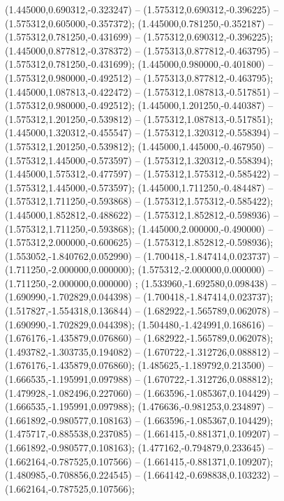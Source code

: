  (1.445000,0.690312,-0.323247) -- (1.575312,0.690312,-0.396225) -- (1.575312,0.605000,-0.357372);
 (1.445000,0.781250,-0.352187) -- (1.575312,0.781250,-0.431699) -- (1.575312,0.690312,-0.396225);
 (1.445000,0.877812,-0.378372) -- (1.575313,0.877812,-0.463795) -- (1.575312,0.781250,-0.431699);
 (1.445000,0.980000,-0.401800) -- (1.575312,0.980000,-0.492512) -- (1.575313,0.877812,-0.463795);
 (1.445000,1.087813,-0.422472) -- (1.575312,1.087813,-0.517851) -- (1.575312,0.980000,-0.492512);
 (1.445000,1.201250,-0.440387) -- (1.575312,1.201250,-0.539812) -- (1.575312,1.087813,-0.517851);
 (1.445000,1.320312,-0.455547) -- (1.575312,1.320312,-0.558394) -- (1.575312,1.201250,-0.539812);
 (1.445000,1.445000,-0.467950) -- (1.575312,1.445000,-0.573597) -- (1.575312,1.320312,-0.558394);
 (1.445000,1.575312,-0.477597) -- (1.575312,1.575312,-0.585422) -- (1.575312,1.445000,-0.573597);
 (1.445000,1.711250,-0.484487) -- (1.575312,1.711250,-0.593868) -- (1.575312,1.575312,-0.585422);
 (1.445000,1.852812,-0.488622) -- (1.575312,1.852812,-0.598936) -- (1.575312,1.711250,-0.593868);
 (1.445000,2.000000,-0.490000) -- (1.575312,2.000000,-0.600625) -- (1.575312,1.852812,-0.598936);
 (1.553052,-1.840762,0.052990) -- (1.700418,-1.847414,0.023737) -- (1.711250,-2.000000,0.000000);
 (1.575312,-2.000000,0.000000) -- (1.711250,-2.000000,0.000000) ;
 (1.533960,-1.692580,0.098438) -- (1.690990,-1.702829,0.044398) -- (1.700418,-1.847414,0.023737);
 (1.517827,-1.554318,0.136844) -- (1.682922,-1.565789,0.062078) -- (1.690990,-1.702829,0.044398);
 (1.504480,-1.424991,0.168616) -- (1.676176,-1.435879,0.076860) -- (1.682922,-1.565789,0.062078);
 (1.493782,-1.303735,0.194082) -- (1.670722,-1.312726,0.088812) -- (1.676176,-1.435879,0.076860);
 (1.485625,-1.189792,0.213500) -- (1.666535,-1.195991,0.097988) -- (1.670722,-1.312726,0.088812);
 (1.479928,-1.082496,0.227060) -- (1.663596,-1.085367,0.104429) -- (1.666535,-1.195991,0.097988);
 (1.476636,-0.981253,0.234897) -- (1.661892,-0.980577,0.108163) -- (1.663596,-1.085367,0.104429);
 (1.475717,-0.885538,0.237085) -- (1.661415,-0.881371,0.109207) -- (1.661892,-0.980577,0.108163);
 (1.477162,-0.794879,0.233645) -- (1.662164,-0.787525,0.107566) -- (1.661415,-0.881371,0.109207);
 (1.480985,-0.708856,0.224545) -- (1.664142,-0.698838,0.103232) -- (1.662164,-0.787525,0.107566);
